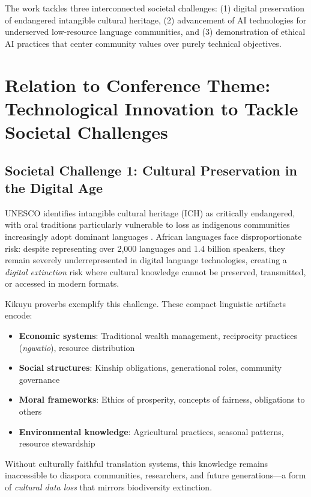 \documentclass[a4paper,11pt]{article}
\begin{document}
The work tackles three interconnected societal challenges: (1) digital preservation of endangered intangible cultural heritage, (2) advancement of AI technologies for underserved low-resource language communities, and (3) demonstration of ethical AI practices that center community values over purely technical objectives.

\section{Relation to Conference Theme: Technological Innovation to Tackle Societal Challenges}

\subsection{Societal Challenge 1: Cultural Preservation in the Digital Age}

UNESCO identifies intangible cultural heritage (ICH) as critically endangered, with oral traditions particularly vulnerable to loss as indigenous communities increasingly adopt dominant languages \cite{unesco2003ich}. African languages face disproportionate risk: despite representing over 2,000 languages and 1.4 billion speakers, they remain severely underrepresented in digital language technologies, creating a \emph{digital extinction} risk where cultural knowledge cannot be preserved, transmitted, or accessed in modern formats.

Kikuyu proverbs exemplify this challenge. These compact linguistic artifacts encode:
\begin{itemize}
    \item \textbf{Economic systems}: Traditional wealth management, reciprocity practices (\emph{ngwatio}), resource distribution
    \item \textbf{Social structures}: Kinship obligations, generational roles, community governance
    \item \textbf{Moral frameworks}: Ethics of prosperity, concepts of fairness, obligations to others
    \item \textbf{Environmental knowledge}: Agricultural practices, seasonal patterns, resource stewardship
\end{itemize}

Without culturally faithful translation systems, this knowledge remains inaccessible to diaspora communities, researchers, and future generations—a form of \emph{cultural data loss} that mirrors biodiversity extinction.
\end{document}

